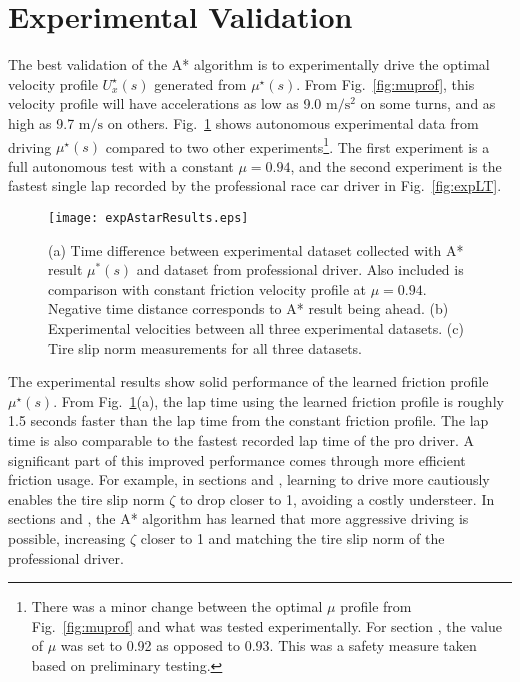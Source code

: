 {{{\section{Experimental Validation}
The best validation of the A* algorithm is to experimentally drive the optimal velocity
profile $U^\star_x(s)$ generated from $\mu^\star(s)$. From Fig.~\ref{fig:muprof}, this velocity profile will have accelerations as low as 9.0 $\mathrm{m/s^2}$
on some turns, and as high as 9.7 $\mathrm{m/s}$ on others. Fig.~\ref{fig:muexpres} shows autonomous experimental data from 
driving $\mu^\star(s)$
compared to two other experiments\footnote{There was a minor change between the optimal $\mu$ profile from Fig.~\ref{fig:muprof} and what was tested experimentally. For section , the value of $\mu$ was set to 0.92 as opposed to 0.93. This
was a safety measure taken based on preliminary testing.}. The first experiment is a full autonomous test with a constant $\mu = 0.94$, and the second experiment is the
fastest single lap recorded by the professional race car driver in Fig.~\ref{fig:expLT}. 

\begin{figure}[tb]
\centering
\texttt{[image: expAstarResults.eps]}
\caption[Time difference between experimental dataset collected with A* result $\mu^*(s)$ and dataset from professional driver.]{(a) Time difference between experimental dataset collected with A* result $\mu^*(s)$ and dataset from professional driver. Also
included is comparison with constant friction velocity profile at $\mu = 0.94$. Negative time distance corresponds to A* result being ahead. (b) Experimental velocities between all three experimental datasets.
(c) Tire slip norm measurements for all three datasets.}
\label{fig:muexpres}
\end{figure}  

 The experimental results show solid performance of the learned friction profile $\mu^\star(s)$. From Fig.~\ref{fig:muexpres}(a), the lap time using the learned friction
 profile is roughly 1.5 seconds faster than the lap time from the constant friction profile. The lap time is also comparable to the fastest
 recorded lap time of the pro driver. A significant part of this improved performance comes through more efficient friction usage.
 For example, in sections  and , learning to drive more cautiously enables the tire slip norm $\zeta$ to drop closer to 1, avoiding
 a costly understeer. In sections  and , the A* algorithm has learned that more aggressive driving is possible, increasing $\zeta$ closer to 1 and matching the tire
slip norm of the professional driver. 

}}}
